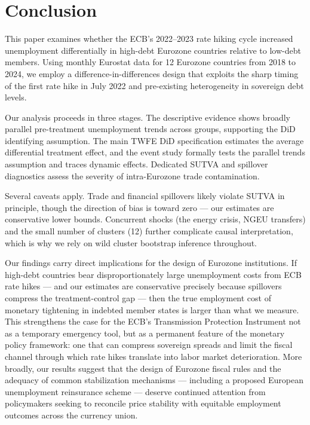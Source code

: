 \documentclass[12pt,a4paper]{article}
\begin{document}
\section{Conclusion}

This paper examines whether the ECB's 2022--2023 rate hiking cycle increased unemployment differentially in high-debt Eurozone countries relative to low-debt members. Using monthly Eurostat data for 12 Eurozone countries from 2018 to 2024, we employ a difference-in-differences design that exploits the sharp timing of the first rate hike in July 2022 and pre-existing heterogeneity in sovereign debt levels.

Our analysis proceeds in three stages. The descriptive evidence shows broadly parallel pre-treatment unemployment trends across groups, supporting the DiD identifying assumption. The main TWFE DiD specification estimates the average differential treatment effect, and the event study formally tests the parallel trends assumption and traces dynamic effects. Dedicated SUTVA and spillover diagnostics assess the severity of intra-Eurozone trade contamination.

Several caveats apply. Trade and financial spillovers likely violate SUTVA in principle, though the direction of bias is toward zero --- our estimates are conservative lower bounds. Concurrent shocks (the energy crisis, NGEU transfers) and the small number of clusters (12) further complicate causal interpretation, which is why we rely on wild cluster bootstrap inference throughout.

Our findings carry direct implications for the design of Eurozone institutions. If high-debt countries bear disproportionately large unemployment costs from ECB rate hikes --- and our estimates are conservative precisely because spillovers compress the treatment-control gap --- then the true employment cost of monetary tightening in indebted member states is larger than what we measure. This strengthens the case for the ECB's Transmission Protection Instrument not as a temporary emergency tool, but as a permanent feature of the monetary policy framework: one that can compress sovereign spreads and limit the fiscal channel through which rate hikes translate into labor market deterioration. More broadly, our results suggest that the design of Eurozone fiscal rules and the adequacy of common stabilization mechanisms --- including a proposed European unemployment reinsurance scheme --- deserve continued attention from policymakers seeking to reconcile price stability with equitable employment outcomes across the currency union.
\end{document}
